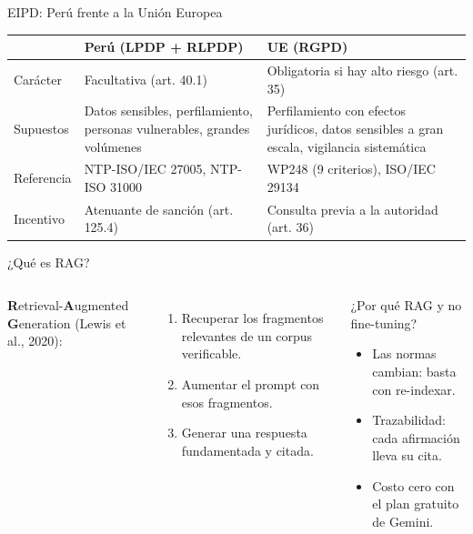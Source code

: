 \documentclass[aspectratio=169,10pt]{beamer}
\begin{document}
\begin{frame}{EIPD: Perú frente a la Unión Europea}
\small
\begin{tabular}{@{}p{}p{}p{}@{}}
\toprule
 & \textbf{Perú (LPDP + RLPDP)} & \textbf{UE (RGPD)} \\
\midrule
Carácter & Facultativa (art. 40.1) & Obligatoria si hay alto riesgo (art. 35) \\
Supuestos & Datos sensibles, perfilamiento, personas vulnerables, grandes volúmenes & Perfilamiento con efectos jurídicos, datos sensibles a gran escala, vigilancia sistemática \\
Referencia & NTP-ISO/IEC 27005, NTP-ISO 31000 & WP248 (9 criterios), ISO/IEC 29134 \\
Incentivo & Atenuante de sanción (art. 125.4) & Consulta previa a la autoridad (art. 36) \\
\bottomrule
\end{tabular}
\end{frame}

\begin{frame}{¿Qué es RAG?}
\begin{columns}[c]
\textbf{R}etrieval-\textbf{A}ugmented \textbf{G}eneration (Lewis et al., 2020):
\begin{enumerate}
  \item \alert{Recuperar} los fragmentos relevantes de un corpus verificable.
  \item \alert{Aumentar} el prompt con esos fragmentos.
  \item \alert{Generar} una respuesta fundamentada y citada.
\end{enumerate}
\begin{block}{¿Por qué RAG y no fine-tuning?}
\small
\begin{itemize}
  \item Las normas cambian: basta con re-indexar.
  \item Trazabilidad: cada afirmación lleva su cita.
  \item Costo cero con el plan gratuito de Gemini.
\end{itemize}
\end{block}
\end{columns}
\end{frame}
\end{document}
